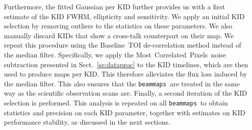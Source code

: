 \documentclass[traditionalabstract]{aa}
\newcommand{\bms}{{\tt beammaps}}
\newcommand{\cmoneb}{{Most~Correlated~Pixels}}
\newcommand{\baseline}{Baseline}%
\newcommand{\lp}[1]{#1}
\newcommand{\rev}[1]{#1}
\begin{document}
{{\lp Furthermore, the fitted Gaussian per KID further provides us with
a first estimate of the KID FWHM, ellipticity and sensitivity. 
We apply an initial KID selection by removing outliers to the statistics
on these parameters. We also manually discard KIDs that show a
cross-talk counterpart on their map. We repeat this
procedure using the \baseline\ TOI de-correlation method instead of the
median filter. Specifically, we apply the \cmoneb\ noise subtraction
presented in Sect.~\ref{se:dataproc} to the KID timelines, which are
then used to produce maps per KID. This therefore alleviates the flux loss
induced by the median filter.}
{\rev This also ensures that the \bms\ are treated in the same way as
the scientific observation scans are.} Finally, a second iteration of
the KID selection is performed.
This analysis is repeated on all \bms\ to obtain statistics and
precision on each KID parameter, together with estimates on KID
performance stability, as discussed in the next sections.

}
\end{document}
